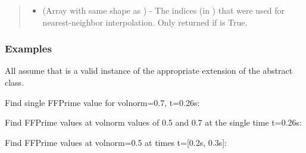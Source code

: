 \documentclass[letterpaper,10pt,english]{sphinxmanual}
\begin{document}
\begin{fulllineitems}
\begin{fulllineitems}
\begin{quote}
\begin{description}
\begin{itemize}
\item {} 
 (Array with same shape as ) - The indices
(in ) that were used for
nearest-neighbor interpolation. Only returned if  is
True.

\end{itemize}


\end{description}\end{quote}
\subsubsection*{Examples}

All assume that  is a valid instance of the appropriate
extension of the {\hyperref[\detokenize{eqtools:eqtools.core.Equilibrium}]{}} abstract class.

Find single FFPrime value for volnorm=0.7, t=0.26s:

\begin{sphinxVerbatim}[commandchars=\\\{\}]
   
\end{sphinxVerbatim}

Find FFPrime values at volnorm values of 0.5 and 0.7 at the single time
t=0.26s:

\begin{sphinxVerbatim}[commandchars=\\\{\}]
  \PYG{p}{[} \PYG{p}{]} 
\end{sphinxVerbatim}

Find FFPrime values at volnorm=0.5 at times t={[}0.2s, 0.3s{]}:

\begin{sphinxVerbatim}[commandchars=\\\{\}]
   \PYG{p}{[} \PYG{p}{]}
\end{sphinxVerbatim}


\end{fulllineitems}
\end{fulllineitems}
\end{document}
